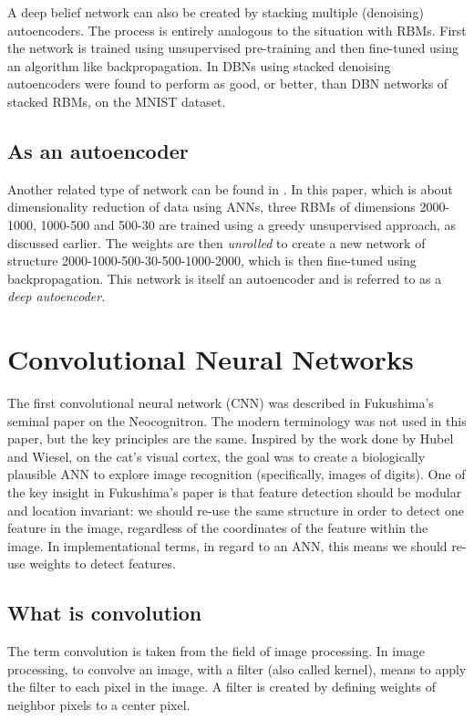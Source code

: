 \documentclass[11pt]{article}
\begin{document}
A deep belief network can also be created by stacking multiple (denoising) autoencoders.  The process is entirely analogous to the situation with RBMs.  First the network is trained using unsupervised pre-training and then fine-tuned using an algorithm like backpropagation.  In \cite{bengio07} DBNs using stacked denoising autoencoders were found to perform as good, or better, than DBN networks of stacked RBMs, on the MNIST dataset.

\subsection{As an autoencoder}

Another related type of network can be found in \cite{hinton06reducing}.  In this paper, which is about dimensionality reduction of data using ANNs, three RBMs of dimensions 2000-1000, 1000-500 and 500-30 are trained using a greedy unsupervised approach, as discussed earlier.  The weights are then \textit{unrolled} to create a new network of structure 2000-1000-500-30-500-1000-2000, which is then fine-tuned using backpropagation.  This network is itself an autoencoder and is referred to as a \textit{deep autoencoder}.

\section{Convolutional Neural Networks}

The first convolutional neural network (CNN) was described in Fukushima's seminal paper on the Neocognitron\cite{fukushima}.  The modern terminology was not used in this paper, but the key principles are the same.  Inspired by the work done by Hubel and Wiesel, on the cat's visual cortex\cite{hubel}, the goal was to create a biologically plausible ANN to explore image recognition (specifically, images of digits).  One of the key insight in Fukushima's paper is that feature detection should be modular and location invariant: we should re-use the same structure in order to detect one feature in the image, regardless of the coordinates of the feature within the image.  In implementational terms, in regard to an ANN, this means we should re-use weights to detect features.

\subsection{What is convolution}

The term convolution is taken from the field of image processing.  In image processing, to convolve an image, with a filter (also called kernel), means to apply the filter to each pixel in the image.  A filter is created by defining weights of neighbor pixels to a center pixel.
\end{document}
